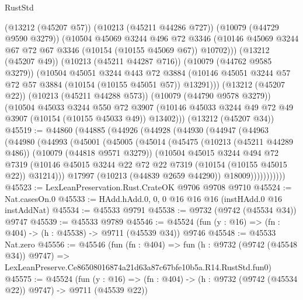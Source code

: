 \begin{lexlean}{RustStd}
\begin{coremodule}
          (@13212 (@45207 @57))
          (@10213 (@45211 @44286 @727))
          (@10079 (@44729 @9590 @3279))
          (@10504
            @45069
            @3244
            @496
            @72
            @3346
            (@10146 @45069 @3244 @67 @72 @67 @3346 (@10154 (@10155 @45069 @67)) @10702)))
        (@13212 (@45207 @49))
        (@10213 (@45211 @44287 @716))
        (@10079 (@44762 @9585 @3279))
        (@10504
          @45051
          @3244
          @443
          @72
          @3884
          (@10146 @45051 @3244 @57 @72 @57 @3884 (@10154 (@10155 @45051 @57)) @13291)))
      (@13212 (@45207 @22))
      (@10213 (@45211 @44288 @573))
      (@10079 (@44790 @9578 @3279))
      (@10504
        @45033
        @3244
        @550
        @72
        @3907
        (@10146 @45033 @3244 @49 @72 @49 @3907 (@10154 (@10155 @45033 @49)) @13402)))
    (@13212 (@45207 @34))
@45519 := @44860
    (@44885
      (@44926
        (@44928
          (@44930
            (@44947
              (@44963
                (@44980
                  (@44993
                    (@45001
                      (@45005
                        (@45014
                          (@45475
                            (@10213 (@45211 @44289 @486))
                            (@10079 (@44818 @9571 @3279))
                            (@10504
                              @45015
                              @3244
                              @494
                              @72
                              @7319
                              (@10146
                                @45015
                                @3244
                                @22
                                @72
                                @22
                                @7319
                                (@10154 (@10155 @45015 @22))
                                @31214)))
                          @17997
                          (@10213 (@44839 @2659 @44290))
                          @18009)))))))))))
@45523 := LexLeanPreservation.Rust.CrateOK @9706 @9708 @9710
@45524 := Nat.casesOn.{0}
@45533 := HAdd.hAdd.{0, 0, 0} @16 @16 @16 (instHAdd.{0} @16 instAddNat)
@45534 := @45533 @9791
@45538 := @9732 (@9742 (@45534 @34)) @9747
@45539 := @45533 @9789
@45546 := @45524 (fun (y : @16) => (fn : @404) -> (h : @45538) -> @9711 (@45539 @34)) @9746
@45548 := @45533 Nat.zero
@45556 := @45546
    (fun (fn : @404) =>
    fun (h : @9732 (@9742 (@45548 @34)) @9747) =>
    LexLeanPreserve.Ce86508016874a21d63a87c67bfe10b5a.R14.RustStd.fun0)
@45575 := @45524
    (fun (y : @16) => (fn : @404) -> (h : @9732 (@9742 (@45534 @22)) @9747) -> @9711 (@45539 @22))

\end{coremodule}
\end{lexlean}
